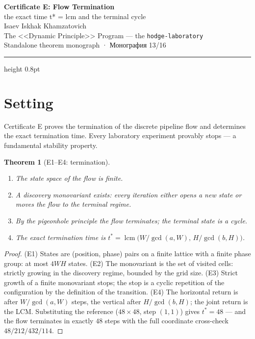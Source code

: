 \documentclass[11pt,a4paper]{article}
\theoremstyle{plain}
\newtheorem{theorem}{Theorem}
\theoremstyle{definition}
\theoremstyle{remark}
\newcommand{\lcm}{\operatorname{lcm}}
\begin{document}
\begin{center}
{\LARGE\bfseries Certificate E: Flow Termination}\\[0.4em]
{\large the exact time t* = lcm and the terminal cycle}\\[0.6em]
{\normalsize Isaev Iskhak Khamzatovich}\\[0.2em]
{\normalsize The <<Dynamic Principle>> Program --- the \texttt{hodge-laboratory}}\\[0.15em]
{\small Standalone theorem monograph · Монография 13/16}
\end{center}
\vspace{0.4em}
{\color{linkblue}\hrule height 0.8pt}
\vspace{0.8em}

\section{Setting}

Certificate E proves the termination of the discrete pipeline flow
and determines the exact termination time. Every laboratory
experiment provably stops --- a fundamental stability property.

\begin{theorem}[E1--E4: termination]\label{th:Estand}
\begin{enumerate}[leftmargin=2em]
\item[(E1)] The state space of the flow is finite.
\item[(E2)] A discovery monovariant exists: every iteration either
opens a new state or moves the flow to the terminal regime.
\item[(E3)] By the pigeonhole principle the flow terminates; the
terminal state is a cycle.
\item[(E4)] The exact termination time is
$t^*=\lcm\bigl(W/\gcd(a,W),\,H/\gcd(b,H)\bigr)$.
\end{enumerate}
\end{theorem}

\begin{proof}
(E1) States are (position, phase) pairs on a finite lattice with a
finite phase group: at most $4WH$ states.
(E2) The monovariant is the set of visited cells: strictly growing
in the discovery regime, bounded by the grid size.
(E3) Strict growth of a finite monovariant stops; the stop is a
cyclic repetition of the configuration by the definition of the
transition.
(E4) The horizontal return is after $W/\gcd(a,W)$ steps, the
vertical after $H/\gcd(b,H)$; the joint return is the LCM.
Substituting the reference ($48\times48$, step $(1,1)$) gives
$t^*=48$ --- and the flow terminates in exactly $48$ steps with the
full coordinate cross-check $48/212/432/114$.
\end{proof}
\end{document}
